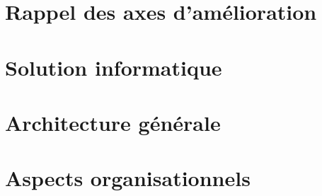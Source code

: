 

\newcommand{\mainTitle}{\'Etude préalable - SPIE}
\newcommand{\secondTitle}{Spécification solution spécifique}
\newcommand{\documentRef}{DS-SSP/4401/1}
\newcommand{\auteurs}{
Lisa \textsc{Courant} \\
Estelle \textsc{Lepeigneux} \\
Pierre \textsc{Jarsaillon} \\
Hugues \textsc{Verlin} \\
}
\newcommand{\chefDeProjet}{Paul \textsc{Dautry}}
\newcommand{\responsableQualite}{Antoine \textsc{Chabert}}




\listoftodos
\newpage

\tableofcontents
\listoffigures
\listoftables
\newpage

\part{Rappel des axes d'amélioration}
\setcounter{section}{0}


\part{Solution informatique}
\setcounter{section}{0}


\part{Architecture générale}
\setcounter{section}{0}


\part{Aspects organisationnels}
\setcounter{section}{0}




